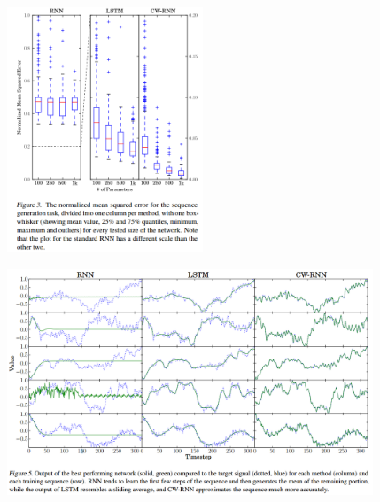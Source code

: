 \documentclass{beamer}
\begin{document}
\frame
{
	\begin{figure}[ht]  
		\begin{center}
			\includegraphics[width=2.3in]{Images/cwrnn_sequence_result.png}   
		\end{center}   
	\end{figure}
}
\frame
{
	\begin{figure}[ht]  
		\begin{center}
			\includegraphics[width=4.3in]{Images/cwrnn_output.png}   
		\end{center}   
	\end{figure}
}
\frame
\end{document}
